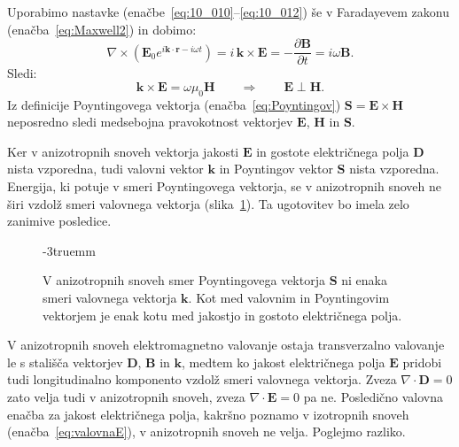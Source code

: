 Uporabimo nastavke (enačbe~\ref{eq:10_010}--\ref{eq:10_012})
še v Faradayevem zakonu (enačba~\ref{eq:Maxwell2}) in dobimo:
\begin{equation}
\nabla \times \left(\mathbf{E}_0 e^{i\mathbf{k}\cdot \mathbf{r} - i \omega t} \right) = 
i\,\mathbf{k}\times \mathbf{E} = - \frac{\partial \mathbf{B}}{\partial t} = i \omega \mathbf{B}.
\label{eq:10_017}
\end{equation}
Sledi:
\begin{equation}
\mathbf{k}\times \mathbf{E} = \omega \mu_0 \mathbf{H} \qquad \Longrightarrow 
\qquad \mathbf{E} \perp \mathbf{H}.
\label{eq:10_018}
\end{equation}
Iz definicije Poyntingovega vektorja (enačba~\ref{eq:Poyntingov})
$\mathbf{S} = \mathbf{E} \times \mathbf{H}$ neposredno sledi medsebojna 
pravokotnost vektorjev $\mathbf{E}$, $\mathbf{H}$ in $\mathbf{S}$.

Ker v anizotropnih snoveh vektorja jakosti $\mathbf{E}$ in gostote električnega 
polja $\mathbf{D}$ nista vzporedna, tudi valovni vektor $\mathbf{k}$ in Poyntingov vektor 
$\mathbf{S}$ nista vzporedna. Energija, ki potuje v smeri Poyntingovega vektorja, se
v anizotropnih snoveh ne širi vzdolž smeri valovnega vektorja (slika~\ref{fig:10_koti}). 
Ta ugotovitev bo imela zelo zanimive posledice.
\begin{figure}[!ht]
\centering
\def\svgwidth{40truemm} 

\caption{V anizotropnih snoveh smer Poyntingovega 
vektorja $\mathbf{S}$ ni enaka smeri valovnega vektorja $\mathbf{k}$. Kot med 
valovnim in Poyntingovim vektorjem je enak kotu med jakostjo in 
gostoto električnega polja.}
\label{fig:10_koti}
\vglue-3truemm
\end{figure}

V anizotropnih snoveh elektromagnetno valovanje ostaja transverzalno
valovanje le s stališča vektorjev $\mathbf{D}$, $\mathbf{B}$ in 
$\mathbf{k}$, medtem ko jakost električnega polja $\mathbf{E}$ pridobi 
tudi longitudinalno komponento vzdolž smeri valovnega vektorja. 
Zveza $\nabla \cdot \mathbf{D} = 0$ zato velja tudi v anizotropnih snoveh, zveza 
$\nabla \cdot \mathbf{E} = 0$ pa ne. Posledično valovna
enačba za jakost električnega polja, kakršno poznamo
v izotropnih snoveh (enačba~\ref{eq:valovnaE}), v anizotropnih snoveh ne velja. Poglejmo 
razliko.

